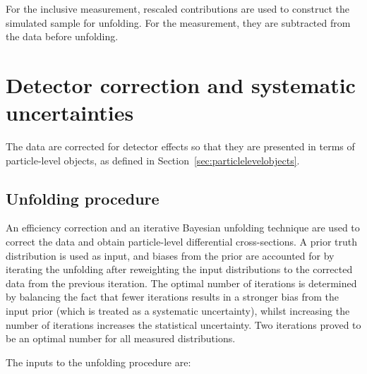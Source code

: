 \documentclass[atlasdraft=false, cernpreprint, UKenglish, texmf, orcidlogo]{atlasdoc}
\begin{document}
For the inclusive measurement, rescaled contributions are used to construct the simulated sample for unfolding. For the \Znunu measurement,
they are subtracted from the data before unfolding.
 
 


 

\section{Detector correction and systematic uncertainties}
 
\label{sec:correction}
 
The data are corrected for detector effects so that they are presented in terms of particle-level objects, as
defined in Section~\ref{sec:particlelevelobjects}.
 
\subsection{Unfolding procedure}
 
An efficiency correction and an iterative Bayesian unfolding technique are used to correct the data and obtain particle-level differential
cross-sections.
A prior truth distribution is used as input, and biases from the prior are accounted for by iterating the unfolding after reweighting the input
distributions to the corrected data from the previous iteration.
The optimal number of iterations is determined by balancing the fact that fewer iterations results in a stronger bias from the input prior
(which is treated as a systematic uncertainty), whilst increasing the number of iterations increases the statistical uncertainty.
Two iterations proved to be an optimal number for all measured distributions.
 
The inputs to the unfolding procedure are:
 
\end{document}
